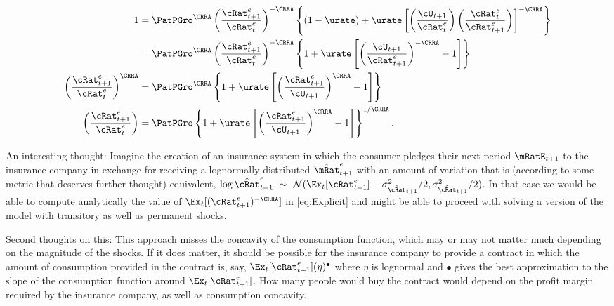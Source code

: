 \documentclass{\handout}
\begin{document}
\begin{align}
        1  & = \PatPGro^{\CRRA} \left(\frac{{\cRat}^{e}_{t+1}}{{\cRat}^{e}_{t}}\right)^{-\CRRA} \left\{(1-\urate)+\urate\left[\left(\frac{\cU_{t+1}}{{\cRat}^{e}_{t}}\right)\left(\frac{{\cRat}^{e}_{t}}{{\cRat}^{e}_{t+1}}\right)\right]^{-\CRRA}\right\} \notag
\\       & = \PatPGro^{\CRRA} \left(\frac{{\cRat}^{e}_{t+1}}{{\cRat}^{e}_{t}}\right)^{-\CRRA} \left\{1+\urate\left[\left(\frac{\cU_{t+1}}{{\cRat}^{e}_{t+1}}\right)^{-\CRRA}-1\right]\right\} \notag %
\\       \left(\frac{{\cRat}^{e}_{t+1}}{{\cRat}^{e}_{t}}\right)^{\CRRA} & = \PatPGro^{\CRRA} \left\{1+\urate\left[\left(\frac{{\cRat}^{e}_{t+1}}{\cU_{t+1}}\right)^{\CRRA}-1\right]\right\} \label{eq:ctp1Oct} \label{eq:cedel}
\\       \left(\frac{{\cRat}^{e}_{t+1}}{{\cRat}^{e}_{t}}\right) & = {\PatPGro} \left\{1+\urate\left[\left(\frac{{\cRat}^{e}_{t+1}}{\cU_{t+1}}\right)^{\CRRA}-1\right]\right\}^{1/\CRRA}.  \notag
\end{align}
\begin{CDCPrivate}
An interesting thought:  Imagine the creation of an insurance system in which the consumer pledges their next period $\mRatE_{t+1}$ to the insurance company in exchange for receiving a lognormally distributed $\hat{\mRat}^{e}_{t+1}$ with an amount of variation that is (according to some metric that deserves further thought) equivalent, $\log \hat{\cRat}^{e}_{t+1}~\sim~\mathcal{N}(\Ex_{t}[{\cRat}^{e}_{t+1}]-\sigma^{2}_{\hat{\cRat}_{t+1}}/2,\sigma^{2}_{\hat{\cRat}_{t+1}}/2)$.  In that case we would be able to compute analytically the value of $\Ex_{t}[(\cRat^{e}_{t+1})^{-\CRRA}]$ in \eqref{eq:Explicit} and might be able to proceed with solving a version of the model with transitory as well as permanent shocks.

Second thoughts on this:  This approach misses the concavity of the consumption function, which may or may not matter much depending on the magnitude of the shocks.  If it does matter, it should be possible for the insurance company to provide a contract in which the amount of consumption provided in the contract is, say, $\Ex_{t}[\cRat^{e}_{t+1}](\eta)^{\bullet}$ where $\eta$ is lognormal and $\bullet$ gives the best approximation to the slope of the consumption function around $\Ex_{t}[\cRat^{e}_{t+1}]$.  How many people would buy the contract would depend on the profit margin required by the insurance company, as well as consumption concavity.
\end{CDCPrivate}
\end{document}
